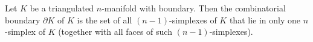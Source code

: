 Let $K$ be a triangulated $n$-manifold with boundary. Then the combinatorial boundary $\partial K$ of $K$ is the set of all $(n-1)$-simplexes of $K$ that lie in only one $n$-simplex of $K$ (together with all faces of such $(n-1)$-simplexes).
